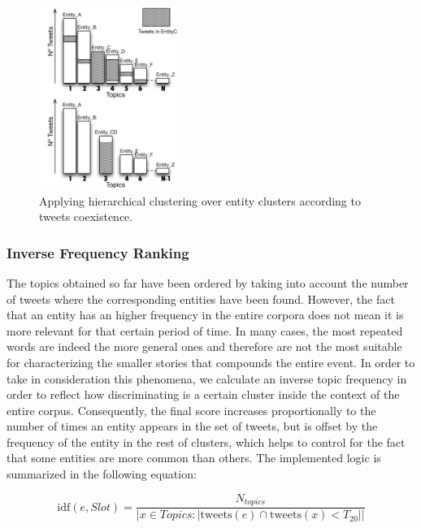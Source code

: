 \documentclass{sig-alternate}
\begin{document}
\begin{figure}[h!]
\centering
\includegraphics[width=0.4\textwidth]{figure/Hierarchical_Cluster.png}
\caption{Applying hierarchical clustering over entity clusters according to tweets coexistence.}
\label{fig:Hierarchical_Cluster}
\end{figure}

\subsubsection{Inverse Frequency Ranking}

The topics obtained so far have been ordered by taking into account the number of tweets where the corresponding entities have been found. However, the fact that an entity has an higher frequency in the entire corpora does not mean it is more relevant for that certain period of time. In many cases, the most repeated words are indeed the more general ones and therefore are not the most suitable for characterizing the smaller stories that compounds the entire event. In order to take in consideration this phenomena, we calculate an inverse topic frequency in order to reflect how discriminating is a certain cluster inside the context of the entire corpus. 
Consequently, the final score increases proportionally to the number of times an entity appears in the set of tweets, but is offset by the frequency of the entity in the rest of clusters, which helps to control for the fact that some entities are more common than others. The implemented logic is summarized in the following equation:

\begin{equation}
\text{idf}(e, Slot) =\frac{N_{topics}}{\left | x\in Topics: \left | \text{tweets}(e)\cap \text{tweets}(x) < T_{20}\right |\right |}
\end{equation}
\end{document}
